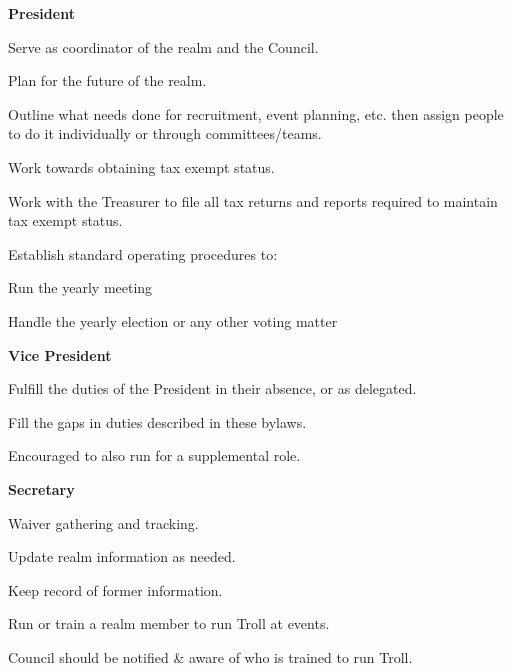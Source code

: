 \documentclass[12pt]{article}
\begin{document}
\begin{level}
    \begin{level}
    \item \textbf{President}
        \begin{level}
            \item Serve as coordinator of the realm and the Council.
            \item Plan for the future of the realm. 
            \item Outline what needs done for recruitment, event planning, etc. then assign people to do it individually or through committees/teams.
            \item Work towards obtaining tax exempt status.
            \item Work with the Treasurer to file all tax returns and reports required to maintain tax exempt status.
            \item Establish standard operating procedures to:
            \begin{level}
                \item Run the yearly meeting
                \item Handle the yearly election or any other voting matter
            \end{level}
        \end{level}
        \item \textbf{Vice President}
        \begin{level}
            \item Fulfill the duties of the President in their absence, or as delegated.
            \item Fill the gaps in duties described in these bylaws.
            \item Encouraged to also run for a supplemental role.
        \end{level}
        \item \textbf{Secretary}
        \begin{level}
            \item Waiver gathering and tracking.
            \item Update realm information as needed.
            \item Keep record of former information.
            \item Run or train a realm member to run Troll at events.
            \begin{level}
                \item Council should be notified \& aware of who is trained to run Troll.
            \end{level}

\end{level}
\end{level}
\end{level}
\end{document}
